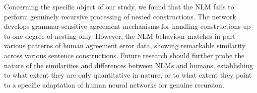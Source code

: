 Concerning the specific object of our study, we found that the NLM fails to perform genuinely recursive processing of nested constructions. The network develops grammar-sensitive agreement mechanisms for handling  constructions up to one degree of nesting only. However, the NLM behaviour matches in part various patterns of human agreement error data, showing remarkable similarity across various sentence constructions. Future research should further probe the nature of the similarities and differences between NLMs and humans, establishing to what extent they are only quantitative in nature, or to what extent they point to a specific adaptation of human neural networks for genuine recursion.